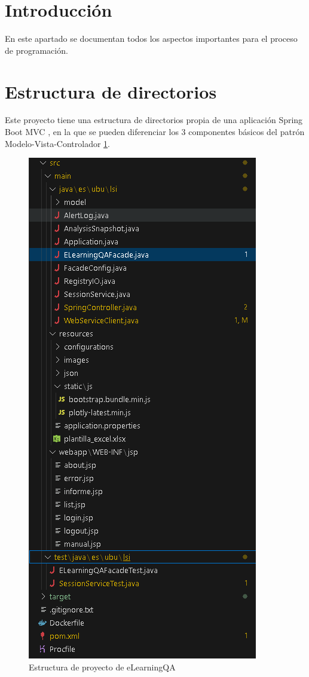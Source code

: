 
\section{Introducción}
En este apartado se documentan todos los aspectos importantes para el proceso de programación.

\section{Estructura de directorios}
Este proyecto tiene una estructura de directorios propia de una aplicación Spring Boot MVC \cite{estructura-mvc}, en la que se pueden diferenciar los 3 componentes básicos del patrón Modelo-Vista-Controlador \ref{fig:estructura-elearningqa}.
\begin{figure}[H]
    \centering
    \includegraphics[width=0.6\linewidth]{img/estructura-proyecto.png}
    \caption{Estructura de proyecto de eLearningQA}
    \label{fig:estructura-elearningqa}
\end{figure}

